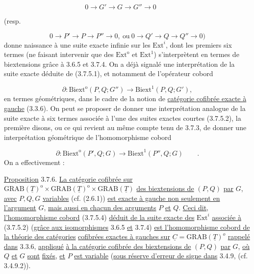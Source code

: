 \begin{equation}\tag{3.7.5.1}
0 \longrightarrow G' \longrightarrow G \longrightarrow G'' \longrightarrow 0 \qquad 
\end{equation}

 (resp.

\begin{equation}\tag{3.7.5.2}
0 \longrightarrow P' \longrightarrow P \longrightarrow P'' \longrightarrow 0,\ \text{ou}\ 0 \longrightarrow Q' \longrightarrow Q \longrightarrow Q'' \longrightarrow 0)
\end{equation}
donne naissance à une suite exacte infinie sur les $\mathrm{Ext}^{i}$, dont les premiers six termes (ne faisant intervenir que des $\mathrm{Ext}^{\mathrm{o}}$ et $\mathrm{Ext}^{1}$) s'interprètent en termes de biextensions grâce à 3.6.5 et 3.7.4. On a déjà signalé une interprétation de la suite exacte déduite de (3.7.5.1), et notamment de l'opérateur cobord

\begin{equation}\tag{3.7.5.3}
\partial : \mathrm{Biext}^{\mathrm{o}}(P,Q;G'') \longrightarrow \mathrm{Biext}^{1}(P,Q;G'),
\end{equation}
en termes géométriques, dans le cadre de la notion de \underline{catégorie cofibrée exacte à gauche} (3.3.6). On peut se proposer de donner une interprétation analogue de la suite exacte à six termes associée à l'une des suites exactes courtes (3.7.5.2), la première disons, ou ce qui revient au même compte tenu de 3.7.3, de donner une interprétation géométrique de l'homomorphisme cobord

\begin{equation}\tag{3.7.5.4}
\partial : \mathrm{Biext}^{\mathrm{o}}(P',Q;G) \longrightarrow \mathrm{Biext}^{1}(P'',Q;G) \qquad .
\end{equation}
On a effectivement :

\underline{Proposition} 3.7.6. \underline{La catégorie cofibrée sur} $\mathrm{GRAB}(\underline{T})^{\mathrm{o}} \times \mathrm{GRAB}(\underline{T})^{\mathrm{o}} \times \mathrm{GRAB}(\underline{T})$ \underline{des biextensions de} $(P,Q)$ \underline{par} $G$, \underline{avec} $P,Q,G$ \underline{variables} (cf. (2.6.1)) \underline{est exacte à gauche non seulement en l'argument} $G$, \underline{mais aussi en chacun des arguments} $P$ \underline{et} $Q$. \underline{Ceci dit,} \underline{l'homomorphisme cobord} (3.7.5.4) \underline{déduit de la suite exacte des} $\mathrm{Ext}^{i}$ \underline{associée à} (3.7.5.2) (\underline{grâce aux isomorphismes} 3.6.5 \underline{et} 3.7.4) \underline{est l'homomorphisme cobord de la théorie des catégories}
\underline{cofibrées exactes à gauches sur} $\underline{C} = \mathrm{GRAB}(\underline{T})^{o}$ \underline{rappelé dans} 3.3.6, \underline{appliqué} \underline{à la catégorie cofibrée des biextensions de} $(P,Q)$ \underline{par} $G$, \underline{où} $Q$ \underline{et} $G$ \underline{sont} \underline{fixés}, \underline{et} $P$ \underline{est variable} (\underline{sous réserve d'erreur de signe dans} 3.4.9, (cf. 3.4.9.2)).

